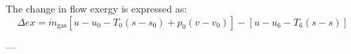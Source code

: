 The change in flow exergy is expressed as:  
\[
\Delta ex = \dot{m}_{\text{gas}} \left[ u - u_0 - T_0 (s - s_0) + p_0 (v - v_0) \right] - \left[ u - u_6 - T_6 (s - s) \right]
\]

---